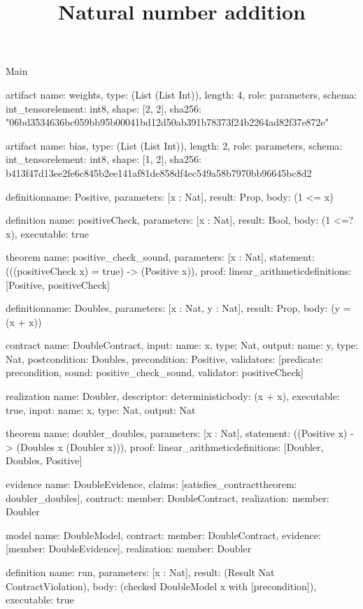 \begin{lexlean}{Main}
\title{Natural number addition}
\begin{semanticmodule}
artifact{
  name: weights,
  type: (List (List Int)),
  length: 4,
  role: parameters,
  schema: int_tensor{element: int8, shape: [2, 2]},
  sha256: "06bd3534636bc059bb95b00041bd12d50ab391b78373f24b2264ad82f37e872e"
}

artifact{
  name: bias,
  type: (List (List Int)),
  length: 2,
  role: parameters,
  schema: int_tensor{element: int8, shape: [1, 2]},
  sha256: b413f47d13ee2fe6c845b2ee141af81de858df4ec549a58b7970bb96645bc8d2
}

definition{name: Positive, parameters: [x : Nat], result: Prop, body: (1 <= x)}

definition{
  name: positiveCheck,
  parameters: [x : Nat],
  result: Bool,
  body: (1 <=? x),
  executable: true
}

theorem{
  name: positive_check_sound,
  parameters: [x : Nat],
  statement: (((positiveCheck x) = true) -> (Positive x)),
  proof: linear_arithmetic{definitions: [Positive, positiveCheck]}
}

definition{name: Doubles, parameters: [x : Nat, y : Nat], result: Prop, body: (y = (x + x))}

contract{
  name: DoubleContract,
  input: {name: x, type: Nat},
  output: {name: y, type: Nat},
  postcondition: Doubles,
  precondition: Positive,
  validators: [{predicate: precondition, sound: positive_check_sound, validator: positiveCheck}]
}

realization{
  name: Doubler,
  descriptor: deterministic{body: (x + x)},
  executable: true,
  input: {name: x, type: Nat},
  output: Nat
}

theorem{
  name: doubler_doubles,
  parameters: [x : Nat],
  statement: ((Positive x) -> (Doubles x (Doubler x))),
  proof: linear_arithmetic{definitions: [Doubler, Doubles, Positive]}
}

evidence{
  name: DoubleEvidence,
  claims: [satisfies_contract{theorem: doubler_doubles}],
  contract: {member: DoubleContract},
  realization: {member: Doubler}
}

model{
  name: DoubleModel,
  contract: {member: DoubleContract},
  evidence: [{member: DoubleEvidence}],
  realization: {member: Doubler}
}

definition{
  name: run,
  parameters: [x : Nat],
  result: (Result Nat ContractViolation),
  body: (checked DoubleModel x with [precondition]),
  executable: true
}


\end{semanticmodule}
\end{lexlean}
